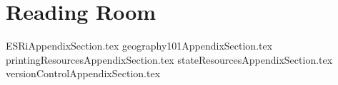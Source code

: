 
\chapter{Reading Room}
{ESRiAppendixSection.tex}
\clearpage
{geography101AppendixSection.tex}
\clearpage
{printingResourcesAppendixSection.tex}
\clearpage
{stateResourcesAppendixSection.tex}
\clearpage
{versionControlAppendixSection.tex}


